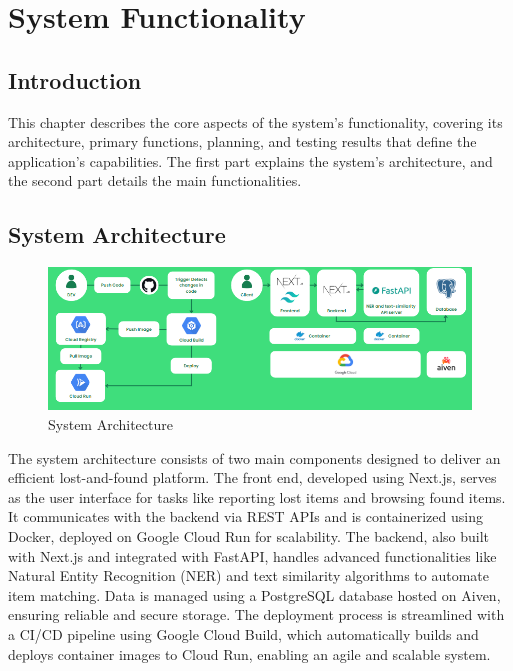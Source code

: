 \chapter{System Functionality}

\section{Introduction}
This chapter describes the core aspects of the system's functionality, covering its architecture, primary functions, planning, and testing results that define the application’s capabilities. The first part explains the system’s architecture, and the second part details the main functionalities.

\section{System Architecture}
\begin{figure}[!h]
    \centering
    \includegraphics[width=1\linewidth]{chapter4/sysarch.png}
    \caption{System Architecture}
    \label{fig:System Architecture}
\end{figure}
The system architecture consists of two main components designed to deliver an efficient lost-and-found platform. The front end, developed using Next.js, serves as the user interface for tasks like reporting lost items and browsing found items. It communicates with the backend via REST APIs and is containerized using Docker, deployed on Google Cloud Run for scalability. The backend, also built with Next.js and integrated with FastAPI, handles advanced functionalities like Natural Entity Recognition (NER) and text similarity algorithms to automate item matching. Data is managed using a PostgreSQL database hosted on Aiven, ensuring reliable and secure storage. The deployment process is streamlined with a CI/CD pipeline using Google Cloud Build, which automatically builds and deploys container images to Cloud Run, enabling an agile and scalable system.

